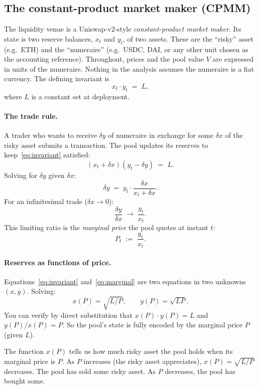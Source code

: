 \documentclass[11pt]{article}
\theoremstyle{definition}
\theoremstyle{remark}
\newcommand{\1}{\mathbf{1}}
\begin{document}
\subsection{The constant-product market maker (CPMM)}

The liquidity venue is a Uniswap-v2-style \emph{constant-product market maker}. Its state is two reserve balances, $x_t$ and $y_t$, of two assets. These are the ``risky'' asset (e.g.\ ETH) and the ``numeraire'' (e.g.\ USDC, DAI, or any other unit chosen as the accounting reference). Throughout, prices and the pool value $V$ are expressed in units of the numeraire. Nothing in the analysis assumes the numeraire is a fiat currency. The defining invariant is
\begin{equation}\label{eq:invariant}
x_t \cdot y_t \;=\; L,
\end{equation}
where $L$ is a constant set at deployment.

\paragraph{The trade rule.}
A trader who wants to receive $\delta y$ of numeraire in exchange for some $\delta x$ of the risky asset submits a transaction. The pool updates its reserves to keep~\eqref{eq:invariant} satisfied:
\[
(x_t + \delta x)(y_t - \delta y) \;=\; L.
\]
Solving for $\delta y$ given $\delta x$:
\[
\delta y \;=\; y_t \cdot \frac{\delta x}{x_t + \delta x}.
\]
For an infinitesimal trade ($\delta x \to 0$):
\[
\frac{\delta y}{\delta x} \;\to\; \frac{y_t}{x_t}.
\]
This limiting ratio is the \emph{marginal price} the pool quotes at instant $t$:
\begin{equation}\label{eq:marginal}
P_t \;:=\; \frac{y_t}{x_t}.
\end{equation}

\paragraph{Reserves as functions of price.}
Equations~\eqref{eq:invariant} and~\eqref{eq:marginal} are two equations in two unknowns $(x, y)$. Solving:
\[
x(P) = \sqrt{L/P}, \qquad y(P) = \sqrt{LP}.
\]
You can verify by direct substitution that $x(P) \cdot y(P) = L$ and $y(P)/x(P) = P$. So the pool's state is fully encoded by the marginal price $P$ (given $L$).

The function $x(P)$ tells us how much risky asset the pool holds when its marginal price is $P$. As $P$ increases (the risky asset appreciates), $x(P) = \sqrt{L/P}$ decreases. The pool has sold some risky asset. As $P$ decreases, the pool has bought some.
\end{document}
